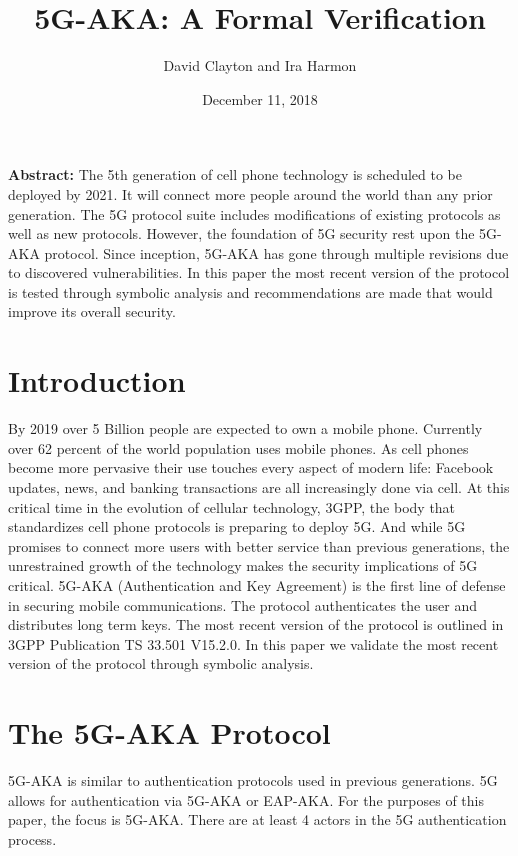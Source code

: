 \documentclass[11pt, pdftex]{article}
\title{5G-AKA: A Formal Verification}
\author{David Clayton and Ira Harmon}
\date{December 11, 2018}
\begin{document}
\maketitle
\textbf{Abstract:} 
The 5th generation of cell phone technology is scheduled to be deployed by 2021.  It will connect more people around the world than any prior generation.  The 5G protocol suite includes modifications of existing protocols as well as new protocols.  However, the foundation of 5G security rest upon the 5G-AKA protocol.  Since inception, 5G-AKA has gone through multiple revisions due to discovered vulnerabilities.  In this paper the most recent version of the protocol is tested through symbolic analysis and recommendations are made that would improve its overall security.

\newpage
\section{Introduction}
By 2019 over 5 Billion people are expected to own a mobile phone.  Currently over 62 percent of the world population uses mobile phones.  As cell phones become more pervasive their use touches every aspect of modern life: Facebook updates, news, and banking transactions are all increasingly done via cell.  At this critical time in the evolution of cellular technology, 3GPP, the body that standardizes cell phone protocols is preparing to deploy 5G.  And while 5G promises to connect more users with better service than previous generations, the unrestrained growth of the technology makes the security implications of 5G critical.  5G-AKA (Authentication and Key Agreement) is the first line of defense in securing mobile communications.  The protocol authenticates the user and distributes long term keys.  The most recent version of the protocol is outlined in 3GPP Publication TS 33.501 V15.2.0.  In this paper we validate the most recent version of the protocol through symbolic analysis.  

\section{The 5G-AKA Protocol}

5G-AKA is similar to authentication protocols used in previous generations.  5G allows for authentication via 5G-AKA or EAP-AKA.  For the purposes of this paper, the focus is 5G-AKA.  There are at least 4 actors in the 5G authentication process.  
\end{document}
